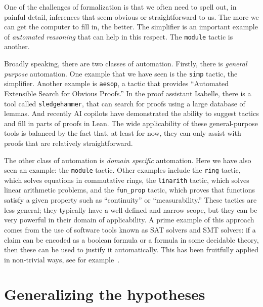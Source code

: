 \documentclass[11pt]{article}
\def\lean{\lstinline[language=lean]}
\begin{document}
One of the challenges of formalization is that we often need to spell out, in painful detail, inferences that seem obvious or straightforward to us.
The more we can get the computer to fill in, the better.
The simplifier is an important example of \emph{automated reasoning} that can help in this respect.
The \lstinline{module} tactic is another.

Broadly speaking, there are two classes of automation.
Firstly, there is \emph{general purpose} automation.
One example that we have seen is the \lean"simp" tactic, the simplifier.
Another example is \lean"aesop",
a tactic that provides ``Automated Extensible Search for Obvious Proofs.''
In the proof assistant Isabelle, there is a tool called \lean"sledgehammer",
that can search for proofs using a large database of lemmas.
And recently AI copilots have demonstrated the ability to suggest tactics and fill in parts of proofs in Lean.
The wide applicability of these general-purpose tools is balanced by the fact that, at least for now, they can only assist with proofs that are relatively straightforward.

The other class of automation is \emph{domain specific} automation.
Here we have also seen an example: the \lean"module" tactic.
Other examples include the \lean"ring" tactic, which solves equations in commutative rings,
the \lean"linarith" tactic, which solves linear arithmetic problems,
and the \lean"fun_prop" tactic, which proves that functions satisfy a given property such as ``continuity'' or ``measurability.''
These tactics are less general; they typically have a well-defined and narrow scope,
but they can be very powerful in their domain of applicability.
A prime example of this approach comes from the use of software tools known as
SAT solvers and SMT solvers:
if a claim can be encoded as a boolean formula or a formula in some decidable theory,
then these can be used to justify it automatically.
This has been fruitfully applied in non-trivial ways, see for example~\cite{MR4449705}.

\section*{Generalizing the hypotheses}

\end{document}
